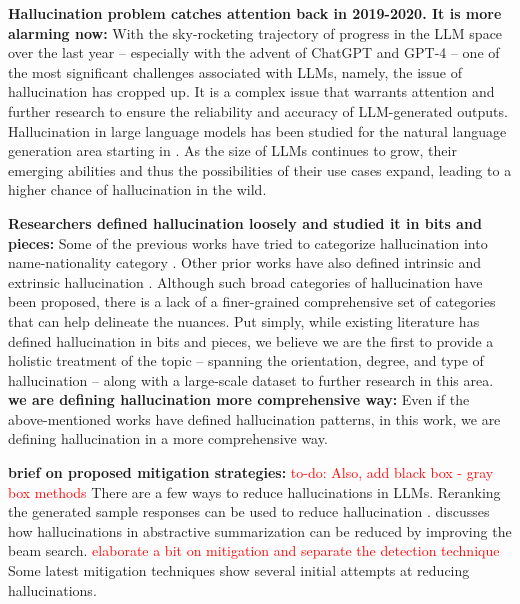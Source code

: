 \textbf{Hallucination problem catches attention back in 2019-2020. It is more alarming now:} With the sky-rocketing trajectory of progress in the LLM space over the last year -- especially with the advent of ChatGPT and GPT-4 -- one of the most significant challenges associated with LLMs, namely, the issue of hallucination has cropped up. It is a complex issue that warrants attention and further research to ensure the reliability and accuracy of LLM-generated outputs. Hallucination in large language models has been studied for the natural language generation area starting in \citep{maynez-etal-2020-faithfulness}. As the size of LLMs continues to grow, their emerging abilities and thus the possibilities of their use cases expand, leading to a higher chance of hallucination in the wild.

\textbf{Researchers defined hallucination loosely and studied it in bits and pieces:} Some of the previous works have tried to categorize hallucination into name-nationality category \citep{ladhak2023pre}. Other prior works have also defined intrinsic and extrinsic hallucination \citep{maynez-etal-2020-faithfulness}. Although such broad categories of hallucination have been proposed, there is a lack of a finer-grained comprehensive set of categories that can help delineate the nuances. Put simply, while existing literature has defined hallucination in bits and pieces, we believe we are the first to provide a holistic treatment of the topic -- spanning the orientation, degree, and type of hallucination -- along with a large-scale dataset to further research in this area. \textbf{we are defining hallucination more comprehensive way:} Even if the above-mentioned works have defined hallucination patterns, in this work, we are defining hallucination in a more comprehensive way.

\textbf{brief on proposed mitigation strategies:}
\textcolor{red}{to-do: Also, add black box - gray box methods} 
There are a few ways to reduce hallucinations in LLMs. Reranking the generated sample responses can be used to reduce hallucination \cite{dale2022detecting}. \cite{sridhar2022improved} discusses how hallucinations in abstractive summarization can be reduced by improving the beam search. 
\textcolor{red}{elaborate a bit on mitigation and separate the detection technique}
Some latest mitigation techniques \cite{li2023halueval,mündler2023selfcontradictory,pfeiffer2023mmt5,chen2023purr,zhang2023mitigating,zhang2023language,ladhak-etal-2023-pre,manakul2023selfcheckgpt,agrawal2023language} show several initial attempts at reducing hallucinations.